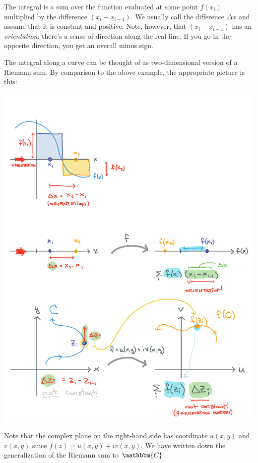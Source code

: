 \begin{example}
\begin{center}
\end{center}
The integral is a sum over the function evaluated at some point $f(x_i)$ multiplied by the difference $(x_i-x_{i-1})$. We usually call the difference $\Delta x$ and assume that it is constant and positive. Note, however, that $(x_i-x_{i-1})$ has an \emph{orientation}: there's a sense of direction along the real line. If you go in the opposite direction, you get an overall minus sign.
\end{example}



The integral along a curve can be thought of as two-dimensional version of a Riemann sum. By comparison to the above example, the appropriate picture is this:
\begin{center}
\includegraphics[width=.7\textwidth]{figures/Complex_06_CRiem.pdf}
\end{center}
Note that the complex plane on the right-hand side has coordinate $u(x,y)$ and $v(x,y)$ since $f(z) = u(x,y) + i v(x,y)$. We have written down the generalization of the Riemann sum to $\mathbbm{C}$. 

